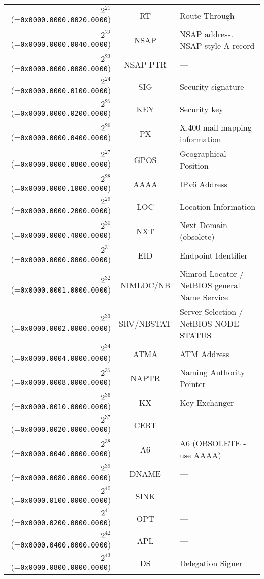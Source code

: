 \documentclass[documentation]{subfiles}
\begin{document}
\begin{longtable}{rcl}
    $2^{21}$ (={\tt 0x0000.0000.0020.0000}) & RT & Route Through \\
    $2^{22}$ (={\tt 0x0000.0000.0040.0000}) & NSAP & NSAP address. NSAP style A record \\
    $2^{23}$ (={\tt 0x0000.0000.0080.0000}) & NSAP-PTR & --- \\
    $2^{24}$ (={\tt 0x0000.0000.0100.0000}) & SIG & Security signature \\
    $2^{25}$ (={\tt 0x0000.0000.0200.0000}) & KEY & Security key \\
    $2^{26}$ (={\tt 0x0000.0000.0400.0000}) & PX & X.400 mail mapping information \\
    $2^{27}$ (={\tt 0x0000.0000.0800.0000}) & GPOS & Geographical Position \\
    $2^{28}$ (={\tt 0x0000.0000.1000.0000}) & AAAA & IPv6 Address \\
    $2^{29}$ (={\tt 0x0000.0000.2000.0000}) & LOC & Location Information \\
    $2^{30}$ (={\tt 0x0000.0000.4000.0000}) & NXT & Next Domain (obsolete) \\
    $2^{31}$ (={\tt 0x0000.0000.8000.0000}) & EID & Endpoint Identifier \\
    $2^{32}$ (={\tt 0x0000.0001.0000.0000}) & NIMLOC/NB & Nimrod Locator / NetBIOS general Name Service \\
    $2^{33}$ (={\tt 0x0000.0002.0000.0000}) & SRV/NBSTAT & Server Selection / NetBIOS NODE STATUS \\
    $2^{34}$ (={\tt 0x0000.0004.0000.0000}) & ATMA & ATM Address \\
    $2^{35}$ (={\tt 0x0000.0008.0000.0000}) & NAPTR & Naming Authority Pointer \\
    $2^{36}$ (={\tt 0x0000.0010.0000.0000}) & KX & Key Exchanger \\
    $2^{37}$ (={\tt 0x0000.0020.0000.0000}) & CERT & --- \\
    $2^{38}$ (={\tt 0x0000.0040.0000.0000}) & A6 & A6 (OBSOLETE - use AAAA) \\
    $2^{39}$ (={\tt 0x0000.0080.0000.0000}) & DNAME & --- \\
    $2^{40}$ (={\tt 0x0000.0100.0000.0000}) & SINK & --- \\
    $2^{41}$ (={\tt 0x0000.0200.0000.0000}) & OPT & --- \\
    $2^{42}$ (={\tt 0x0000.0400.0000.0000}) & APL & --- \\
    $2^{43}$ (={\tt 0x0000.0800.0000.0000}) & DS & Delegation Signer \\

\end{longtable}
\end{document}
